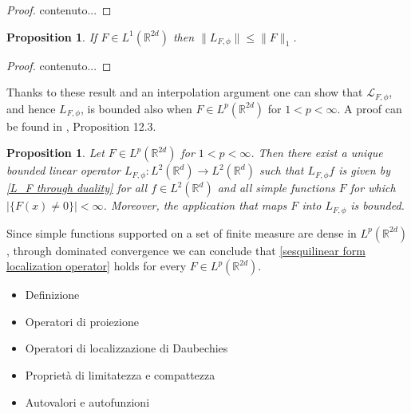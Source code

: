 \documentclass[corpo=11pt, stile=classica, tipotesi=custom,
greek, evenboxes, english]{toptesi}
\numberwithin{equation}{chapter}
\newtheorem{prop}[teo]{Proposition}
\theoremstyle{remark}
\newcommand{\R}{\mathbb{R}} %
\renewcommand{\L}{\mathscr{L}} %
\begin{document}
\begin{proof}
	contenuto...
\end{proof}
\begin{prop}\label{F integrable L_F bounded}
	If $F \in L^1(\R^{2d})$ then $\| L_{F,\phi}\| \leq \| F \|_1$.
\end{prop}
\begin{proof}
	contenuto...
\end{proof}
Thanks to these result and an interpolation argument one can show that $\L_{F,\phi}$, and hence $L_{F,\phi}$, is bounded also when $F \in L^p(\R^{2d})$ for $1 < p < \infty$. A proof can be found in \cite{wong}, Proposition 12.3.
\begin{prop}\label{F in Lp L_F bounded}
	Let $F \in L^p(\R^{2d})$ for $1 < p < \infty$. Then there exist a unique bounded linear operator $L_{F,\phi} : L^2(\R^d) \rightarrow L^2(\R^d)$ such that $L_{F,\phi} f$ is given by \eqref{L_F through duality} for all $f \in L^2(\R^d)$ and all simple functions $F$ for which $|\{F(x) \neq 0\}| < \infty$. Moreover, the application that maps $F$ into $L_{F,\phi}$ is bounded.
\end{prop}
{\color{blue} Since simple functions supported on a set of finite measure are dense in $L^p(\R^{2d})$, through dominated convergence we can conclude that \eqref{sesquilinear form localization operator} holds for every $F \in L^p(\R^{2d})$.}
\begin{itemize}
	\item Definizione
	\item Operatori di proiezione
	\item Operatori di localizzazione di Daubechies
	\item Proprietà di limitatezza e compattezza
	\item Autovalori e autofunzioni
\end{itemize}
\end{document}

